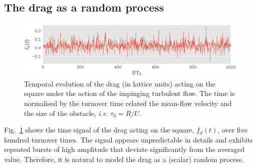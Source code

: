 \documentclass[pre,aps,floatfix,10pt,superscriptaddress, notitlepage,preprint]{revtex4-1}
\begin{document}
\subsection{The drag as a random process
}
\label{sec:pdfs}

\begin{figure}
  \centering
  \includegraphics[width=0.7\linewidth]{typical_drag_signal/typical_drag_signal.png}
  \caption{Temporal evolution of the drag (in lattice units) acting on the square under the action of the impinging turbulent flow. The time is normalised by the turnover time related the mean-flow velocity and the size of the obstacle, \emph{i.e.} $\tau_0=R/U$.}
  \label{fig:typical_drag_signal}
\end{figure}



%
Fig.~\ref{fig:typical_drag_signal} shows the time signal of the drag acting on the square, $f_d(t)$, over five hundred turnover times.
The signal appears unpredictable in details and exhibits repeated bursts of high amplitude that deviate significantly from the averaged value.
Therefore, it is  natural to model the drag as a (scalar) random process.
\end{document}
